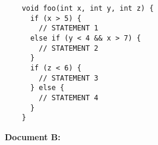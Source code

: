 \documentclass{report}
\begin{document}
\begin{spacing}{1.4}
\begin{enumerate}[leftmargin=*]

    

    \begin{lstlisting}
    void foo(int x, int y, int z) {
      if (x > 5) {
        // STATEMENT 1
      else if (y < 4 && x > 7) {
        // STATEMENT 2
      }
      if (z < 6) {
        // STATEMENT 3
      } else {
        // STATEMENT 4
      }
    }
    \end{lstlisting}

\vspace{0.5in}
    
    \textbf{Document B:}


\end{enumerate}
\end{spacing}
\end{document}
